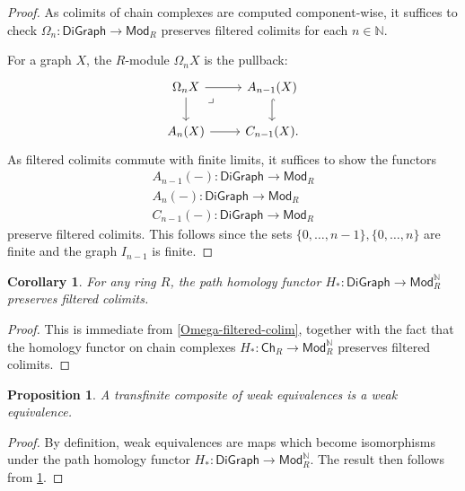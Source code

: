 \documentclass[11pt]{article}
\newtheorem{proposition}[theo]{Proposition}
\newtheorem{corollary}[theo]{Corollary}
\theoremstyle{definition}
\numberwithin{equation}{section}
\newcommand{\ModR}{\mathsf{Mod}_R}
\newcommand{\ModRN}{\mathsf{Mod}_R^{\mathbb{N}}}
\newcommand{\Ch}{\mathsf{Ch}}
\newcommand{\DiGraph}{\mathsf{DiGraph}}
\newcommand{\pullback}{\arrow [dr, phantom, "\lrcorner" very near start]}
\newcommand{\from}{\colon}
\begin{document}
\begin{proof}
As colimits of chain complexes are computed component-wise, it suffices to check $\Omega_n \from \DiGraph \to \ModR$ preserves filtered colimits for each $n \in \mathbb{N}$.
    
    For a graph $X$, the $R$-module $\Omega_n X$ is the pullback:
    \[ \begin{tikzcd}
        \Omega_n X \ar[r] \ar[d] \pullback & A_{n-1}(X) \ar[d, hook] \\
        A_{n}(X) \ar[r] & C_{n-1}(X).
    \end{tikzcd} \]
    As filtered colimits commute with finite limits, it suffices to show the functors
    \begin{align*}
        A_{n-1}(-) \from \DiGraph \to \ModR \\
        A_n(-) \from \DiGraph \to \ModR \\
        C_{n-1}(-) \from \DiGraph \to \ModR
    \end{align*}
    preserve filtered colimits.
    This follows since the sets $\{ 0, \dots, n-1 \}, \{ 0, \dots, n \}$ are finite and the graph $I_{n-1}$ is finite.
\end{proof}

\begin{corollary} \label{homology-filtered-colim}
    For any ring $R$, the path homology functor $H_* \from \DiGraph \to \ModRN$ preserves filtered colimits.
\end{corollary}
\begin{proof}
    This is immediate from \cref{Omega-filtered-colim}, together with the fact that the homology functor on chain complexes $H_* \from \Ch_R \to \ModRN$ preserves filtered colimits.
\end{proof}

\begin{proposition} \label{weq-transf-comp}
    A transfinite composite of weak equivalences is a weak equivalence.
\end{proposition}
\begin{proof}
    By definition, weak equivalences are maps which become isomorphisms under the path homology functor $H_* \from \DiGraph \to \ModRN$.
    The result then follows from \cref{homology-filtered-colim}.
\end{proof}
\end{document}
